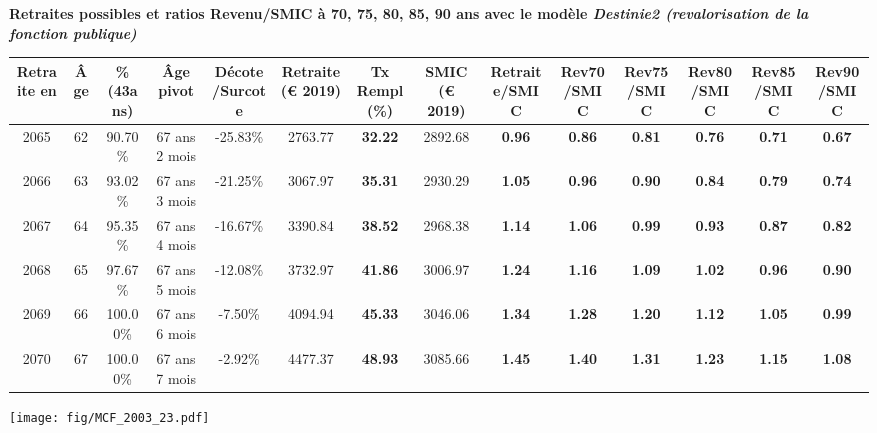  \vspace{0.1cm} 
{\bf \noindent Retraites possibles et ratios Revenu/SMIC à 70, 75, 80, 85, 90 ans avec le modèle \emph{Destinie2 (revalorisation de la fonction publique)}}  
 
\begin{adjustbox}{max width=\textwidth} 
\begin{tabular}[htb]{|c|c||c|c|c||c|c||c||c|c|c|c|c|c|} 
\hline 
 Retraite en &  Âge &  \%(43ans) &  Âge pivot &  Décote/Surcote &  Retraite (\euro{} 2019) &  Tx Rempl(\%) &  SMIC (\euro{} 2019) &  Retraite/SMIC &  Rev70/SMIC &  Rev75/SMIC &  Rev80/SMIC &  Rev85/SMIC &  Rev90/SMIC \\ 
\hline \hline 
 2065 &  62 &  90.70\% &  67 ans 2 mois &  -25.83\% &  2763.77 &  {\bf 32.22} &  2892.68 &  {\bf {\color{red} 0.96}} &  {\bf {\color{red} 0.86}} &  {\bf {\color{red} 0.81}} &  {\bf {\color{red} 0.76}} &  {\bf {\color{red} 0.71}} &  {\bf {\color{red} 0.67}} \\ 
\hline 
 2066 &  63 &  93.02\% &  67 ans 3 mois &  -21.25\% &  3067.97 &  {\bf 35.31} &  2930.29 &  {\bf 1.05} &  {\bf {\color{red} 0.96}} &  {\bf {\color{red} 0.90}} &  {\bf {\color{red} 0.84}} &  {\bf {\color{red} 0.79}} &  {\bf {\color{red} 0.74}} \\ 
\hline 
 2067 &  64 &  95.35\% &  67 ans 4 mois &  -16.67\% &  3390.84 &  {\bf 38.52} &  2968.38 &  {\bf 1.14} &  {\bf 1.06} &  {\bf {\color{red} 0.99}} &  {\bf {\color{red} 0.93}} &  {\bf {\color{red} 0.87}} &  {\bf {\color{red} 0.82}} \\ 
\hline 
 2068 &  65 &  97.67\% &  67 ans 5 mois &  -12.08\% &  3732.97 &  {\bf 41.86} &  3006.97 &  {\bf 1.24} &  {\bf 1.16} &  {\bf 1.09} &  {\bf 1.02} &  {\bf {\color{red} 0.96}} &  {\bf {\color{red} 0.90}} \\ 
\hline 
 2069 &  66 &  100.00\% &  67 ans 6 mois &  -7.50\% &  4094.94 &  {\bf 45.33} &  3046.06 &  {\bf 1.34} &  {\bf 1.28} &  {\bf 1.20} &  {\bf 1.12} &  {\bf 1.05} &  {\bf {\color{red} 0.99}} \\ 
\hline 
 2070 &  67 &  100.00\% &  67 ans 7 mois &  -2.92\% &  4477.37 &  {\bf 48.93} &  3085.66 &  {\bf 1.45} &  {\bf 1.40} &  {\bf 1.31} &  {\bf 1.23} &  {\bf 1.15} &  {\bf 1.08} \\ 
\hline 
\hline 
\end{tabular} 
\end{adjustbox} 
 
 \vspace{0.1cm} 

 \begin{center}\texttt{[image: fig/MCF\_2003\_23.pdf]}\end{center} \label{fig/MCF_2003_23.pdf} 


